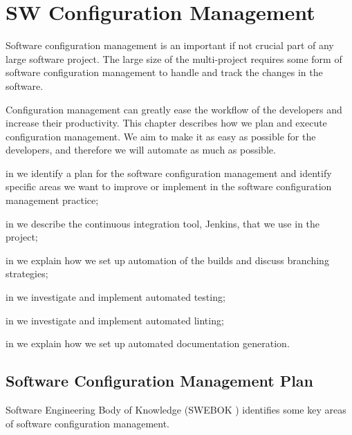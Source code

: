 \chapter{SW Configuration Management}\label{chap:config_management}
Software configuration management is an important if not crucial part of any large software project. The large size of the multi-project requires some form of software configuration management to handle and track the changes in the software.

Configuration management can greatly ease the workflow of the developers and increase their productivity. This chapter describes how we plan and execute configuration management. We aim to make it as easy as possible for the developers, and therefore we will automate as much as possible.


\begin{chapterorganization}
  \item in  we identify a plan for the software configuration management and identify specific areas we want to improve or implement in the software configuration management practice;
  \item in  we describe the continuous integration tool, Jenkins, that we use in the project;
  \item in  we explain how we set up automation of the builds and discuss branching strategies;
  \item in  we investigate and implement automated testing;
  \item in  we investigate and implement automated linting;
  \item in  we explain how we set up automated documentation generation.
\end{chapterorganization}

\section{Software Configuration Management Plan}\label{sec:SCM_vision}
Software Engineering Body of Knowledge (SWEBOK ) identifies some key areas of software configuration management.

